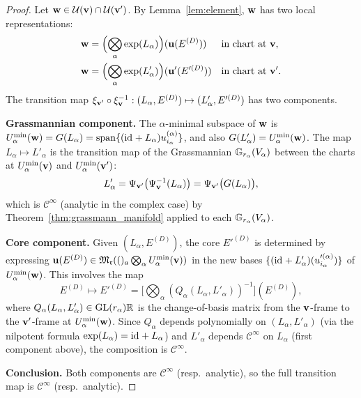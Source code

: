 \begin{proof}
Let $\mathbf{w} \in \mathcal{U}(\mathbf{v}) \cap \mathcal{U}(\mathbf{v}')$. By Lemma~\ref{lem:element},
$\mathbf{w}$ has two local representations:
\begin{align*}
    \mathbf{w} &= \Bigl(\bigotimes_\alpha \exp(L_\alpha)\Bigr)(\mathbf{u}(E^{(D)}))
    && \text{in chart at }\mathbf{v},\\
    \mathbf{w} &= \Bigl(\bigotimes_\alpha \exp(L'_\alpha)\Bigr)(\mathbf{u}'(E'^{(D)}))
    && \text{in chart at }\mathbf{v}'.
\end{align*}
The transition map
$\xi_{\mathbf{v}'} \circ \xi_{\mathbf{v}}^{-1}: (L_\alpha, E^{(D)}) \mapsto
(L'_\alpha, E'^{(D)})$
has two components.

\textbf{Grassmannian component.}
The $\alpha$-minimal subspace of $\mathbf{w}$ is $U^{\min}_{\alpha}(\mathbf{w}) =
G(L_\alpha) = \mathrm{span}\{(\mathrm{id}_{} + L_\alpha)u^{(\alpha)}_{i_\alpha}\}$,
and also $G(L'_\alpha) = U^{\min}_{\alpha}(\mathbf{w})$. The map
$L_\alpha \mapsto L'_\alpha$ is the transition map of the Grassmannian
$\mathbb{G}_{r_\alpha}(V_\alpha)$ between the charts at
$U^{\min}_{\alpha}(\mathbf{v})$ and $U^{\min}_{\alpha}(\mathbf{v}')$:
\begin{equation*}
    L'_\alpha
    = \Psi_{\mathbf{v}'}\bigl(\Psi_{\mathbf{v}}^{-1}(L_\alpha)\bigr)
    = \Psi_{\mathbf{v}'}\bigl(G(L_\alpha)\bigr),
\end{equation*}
which is $\mathcal{C}^\infty$ (analytic in the complex case) by
Theorem~\ref{thm:grassmann_manifold} applied to each
$\mathbb{G}_{r_\alpha}(V_\alpha)$.

\textbf{Core component.}
Given $(L_\alpha, E^{(D)})$, the core $E'^{(D)}$ is determined by
expressing $\mathbf{u}(E^{(D)}) \in \mathfrak{M}_{\mathfrak{r}}((){}_a\bigotimes_\alpha
U^{\min}_{\alpha}(\mathbf{v}))$ in the new bases
$\{(\mathrm{id}_{} + L'_\alpha)(u'^{(\alpha)}_{i_\alpha})\}$ of $U^{\min}_{\alpha}(\mathbf{w})$.
This involves the map
\begin{equation*}
    E^{(D)} \longmapsto E'^{(D)}
    = \bigl[\bigotimes_\alpha (Q_\alpha(L_\alpha, L'_\alpha))^{-1}\bigr]
    (E^{(D)}),
\end{equation*}
where $Q_\alpha(L_\alpha, L'_\alpha) \in \mathrm{GL}(r_\alpha){\mathbb{R}}$ is the
change-of-basis matrix from the $\mathbf{v}$-frame to the $\mathbf{v}'$-frame
at $U^{\min}_{\alpha}(\mathbf{w})$. Since $Q_\alpha$ depends polynomially on
$(L_\alpha, L'_\alpha)$ (via the nilpotent formula
$\exp(L_\alpha) = \mathrm{id}_{} + L_\alpha$) and $L'_\alpha$ depends
$\mathcal{C}^\infty$ on $L_\alpha$ (first component above), the
composition is $\mathcal{C}^\infty$.

\textbf{Conclusion.}
Both components are $\mathcal{C}^\infty$ (resp.\ analytic), so the
full transition map is $\mathcal{C}^\infty$ (resp.\ analytic).
\end{proof}

